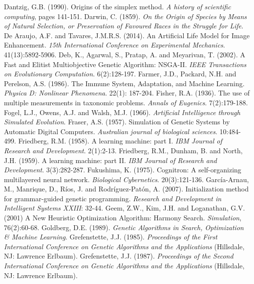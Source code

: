 \documentclass[spanish,a4paper,12pt,twoside]{report}
\begin{document}
\begin{thebibliography}{00}
   Dantzig, G.B. (1990). Origins of the simplex method. \emph{A history of scientific computing}, pages 141-151.
   Darwin, C. (1859). \emph{On the Origin of Species by Means of Natural Selection, or Preservation of Favoured Races in the Struggle for Life}. 
   De Araujo, A.F. and Tavares, J.M.R.S. (2014). An Artificial Life Model for Image Enhancement. \emph{15th International Conference on Experimental Mechanics}. 41(13):5892-5906.
   Deb, K., Agarwal, S., Pratap, A. and Meyarivan, T. (2002). A Fast and Elitist Multiobjective Genetic Algorithm: NSGA-II. \emph{IEEE Transactions on Evolutionary Computation}. 6(2):128-197.
   Farmer, J.D., Packard, N.H. and Perelson, A.S. (1986). The Immune System, Adaptation, and Machine Learning. \emph{Physica D: Nonlinear Phenomena}. 22(1): 187-204.
   Fisher, R.A. (1936). The use of multiple measurements in taxonomic problems. \emph{Annals of Eugenics}. 7(2):179-188.
   Fogel, L.J., Owens, A.J. and Walsh, M.J. (1966). \emph{Artificial Intelligence through Simulated Evolution}.
   Fraser, A.S. (1957). Simulation of Genetic Systems by Automatic Digital Computers. \emph{Australian journal of biological sciences}. 10:484-499.
   Friedberg, R.M. (1958). A learning machine: part I. \emph{IBM Journal of Research and Development}. 2(1):2-13.
   Friedberg, R.M., Dunham, B. and North, J.H. (1959). A learning machine: part II. \emph{IBM Journal of Research and Development}. 3(3):282-287.
   Fukushima, K. (1975). Cognitron: A self-organizing multilayered neural network. \emph{Biological Cybernetics}. 20(3):121-136.
   García-Arnau, M., Manrique, D., Ríos, J. and Rodríguez-Patón, A. (2007). Initialization method for grammar-guided genetic programming. \emph{Research and Development in Intelligent Systems XXIII}: 32-44.
   Geem, Z.W., Kim, J.H. and Loganathan, G.V. (2001) A New Heuristic Optimization Algorithm: Harmony Search. \emph{Simulation}, 76(2):60-68.
   Goldberg, D.E. (1989). \emph{Genetic Algorithms in Search, Optimization \& Machine Learning}.
   Grefenstette, J.J. (1985). \emph{Proceedings of the First International Conference on Genetic Algorithms and the Applications} (Hillsdale, NJ: Lawrence Erlbaum).
   Grefenstette, J.J. (1987). \emph{Proceedings of the Second International Conference on Genetic Algorithms and the Applications} (Hillsdale, NJ: Lawrence Erlbaum).

\end{thebibliography}
\end{document}
